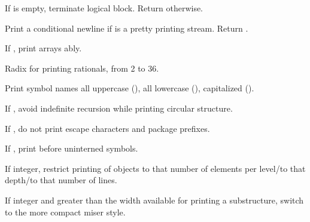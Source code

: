 \begin{LIST}{1cm}
\begin{LIST}{.5cm}
    {
      If  is empty, terminate logical block. Return
      \retval{\NIL} otherwise.
    }
    
  \end{LIST}

  {
    Print a conditional newline if  is a pretty printing
    stream. Return \retval{\NIL}. 
  }

  {
    If \T, print arrays ably.
  }

  {
    Radix for printing rationals, from 2 to 36.
  }

  {
    Print symbol names all uppercase (), all lowercase
    (), capitalized ().
  }

  {
    If \T, avoid indefinite recursion while printing circular
    structure. 
  }

  {
    If \NIL, do not print escape characters and package prefixes.
  }

  {
    If \T, print \kwd{\#:} before uninterned symbols.
  }

  {
    If integer, restrict printing of objects to that number of
    elements per level/to that depth/to that number of lines.
  }

  {
    If integer and greater than the width available for printing a
    substructure, switch to the more compact miser style.
  }


\end{LIST}
